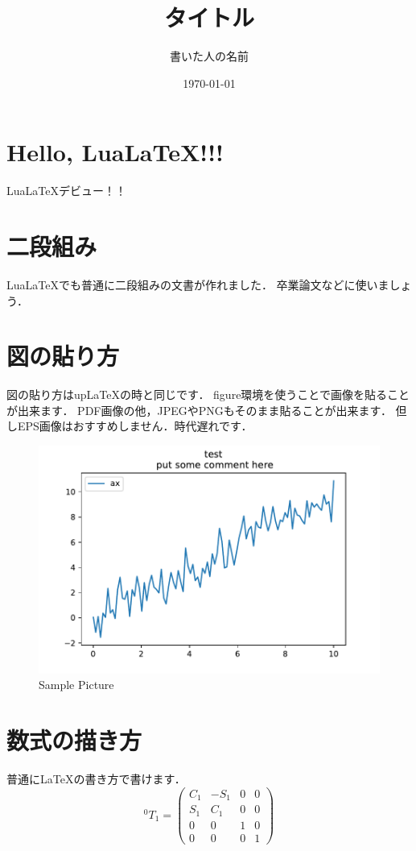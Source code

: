 \documentclass[a4paper, 11pt, lualatex, ja=standard, twocolumn]{bxjsarticle}
\title{\Huge タイトル}
\author{\huge 書いた人の名前}
\date{\today}
\begin{document}
  \maketitle

  \section{Hello, Lua\LaTeX !!!}
    Lua\LaTeX デビュー！！

  \section{二段組み}
    Lua\LaTeX でも普通に二段組みの文書が作れました．
    卒業論文などに使いましょう．
  
  \section{図の貼り方}
    図の貼り方はup\LaTeX の時と同じです．
    figure環境を使うことで画像を貼ることが出来ます．
    PDF画像の他，JPEGやPNGもそのまま貼ることが出来ます．
    但しEPS画像はおすすめしません．時代遅れです．

    \begin{figure}[h]
      \centering
      \includegraphics[width=60truemm, clip]{images/graph_sample.pdf}
      \caption{Sample Picture}
      \label{fig:sample}
    \end{figure}
  
  \section{数式の描き方}
    普通に\LaTeX の書き方で書けます．
    \begin{equation}
    {}^0\!T_{1}=\begin{pmatrix} C_{1} & -S_{1} & 0 & 0 \\ S_{1} & C_1 & 0 & 0 \\ 0 & 0 & 1 & 0 \\ 0 & 0 & 0 & 1 \end{pmatrix}
    \end{equation}
\end{document}
